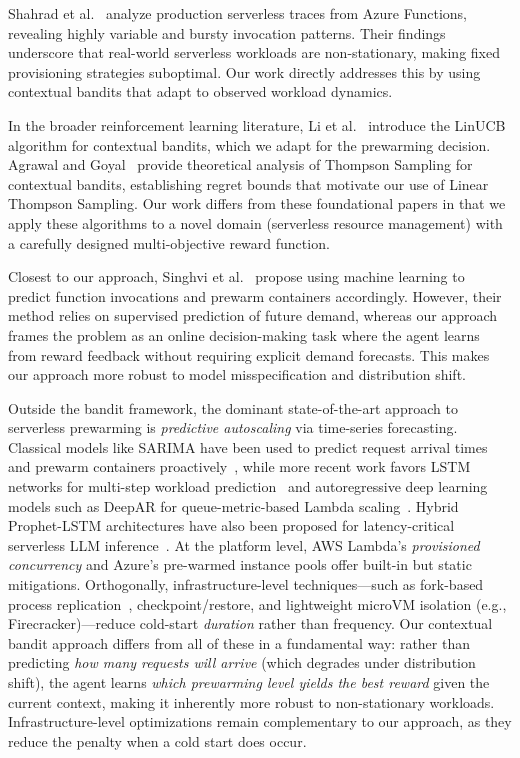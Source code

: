 \documentclass[11pt]{article}
\begin{document}
Shahrad et al.~\cite{shahrad2020} analyze production serverless traces from Azure Functions, revealing highly variable and bursty invocation patterns. Their findings underscore that real-world serverless workloads are non-stationary, making fixed provisioning strategies suboptimal. Our work directly addresses this by using contextual bandits that adapt to observed workload dynamics.

In the broader reinforcement learning literature, Li et al.~\cite{li2010} introduce the LinUCB algorithm for contextual bandits, which we adapt for the prewarming decision. Agrawal and Goyal~\cite{agrawal2013} provide theoretical analysis of Thompson Sampling for contextual bandits, establishing regret bounds that motivate our use of Linear Thompson Sampling. Our work differs from these foundational papers in that we apply these algorithms to a novel domain (serverless resource management) with a carefully designed multi-objective reward function.

Closest to our approach, Singhvi et al.~\cite{singhvi2021} propose using machine learning to predict function invocations and prewarm containers accordingly. However, their method relies on supervised prediction of future demand, whereas our approach frames the problem as an online decision-making task where the agent learns from reward feedback without requiring explicit demand forecasts. This makes our approach more robust to model misspecification and distribution shift.

Outside the bandit framework, the dominant state-of-the-art approach to serverless prewarming is \textit{predictive autoscaling} via time-series forecasting. Classical models like SARIMA have been used to predict request arrival times and prewarm containers proactively~\cite{yemets2024}, while more recent work favors LSTM networks for multi-step workload prediction~\cite{suleiman2024} and autoregressive deep learning models such as DeepAR for queue-metric-based Lambda scaling~\cite{kyrychenko2025}. Hybrid Prophet-LSTM architectures have also been proposed for latency-critical serverless LLM inference~\cite{flashserve2025}. At the platform level, AWS Lambda's \textit{provisioned concurrency} and Azure's pre-warmed instance pools offer built-in but static mitigations. Orthogonally, infrastructure-level techniques---such as fork-based process replication~\cite{chai2025}, checkpoint/restore, and lightweight microVM isolation (e.g., Firecracker)---reduce cold-start \textit{duration} rather than frequency. Our contextual bandit approach differs from all of these in a fundamental way: rather than predicting \textit{how many requests will arrive} (which degrades under distribution shift), the agent learns \textit{which prewarming level yields the best reward} given the current context, making it inherently more robust to non-stationary workloads. Infrastructure-level optimizations remain complementary to our approach, as they reduce the penalty when a cold start does occur.
\end{document}
